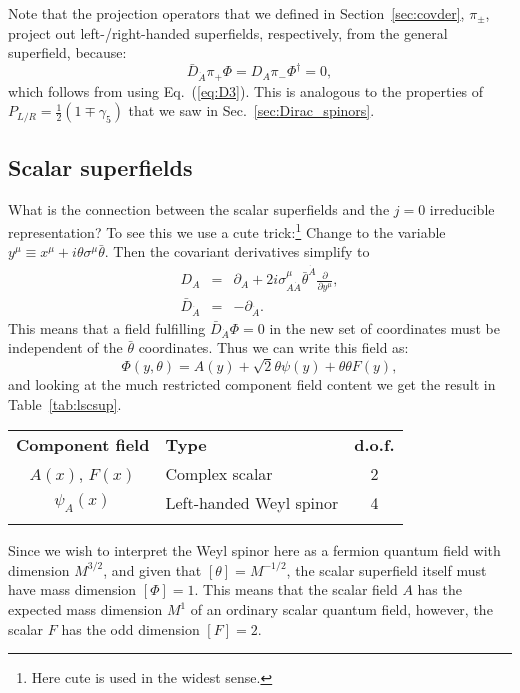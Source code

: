 \documentclass[notes.tex]{subfiles}
\begin{document}
Note that the projection operators that we defined in Section~\ref{sec:covder}, $\pi_\pm$, project out left-/right-handed superfields, respectively,  from the general superfield, because:
\[\bar{D}_{\dot{A}}\pi_+\Phi = D_A \pi_- \Phi^\dagger = 0, \]
which follows from using Eq.~(\ref{eq:D3}). This is analogous to the properties of $P_{L/R} = \frac{1}{2}(1\mp \gamma_5)$ that we saw in Sec.~\ref{sec:Dirac_spinors}.

\subsection{Scalar superfields}
What is the connection between the scalar superfields and the $j=0$ irreducible representation? To see this we use a cute trick:\footnote{Here cute is used in the widest sense.} Change to the variable $y^\mu \equiv x^\mu + i\theta\sigma^\mu \bar{\theta}$. Then the covariant derivatives simplify to
\begin{eqnarray}
D_A &=& \partial_A + 2i\sigma^\mu_{A\dot{A}}\bar{\theta}^{\dot{A}}\frac{\partial}{\partial y^\mu},\\
\bar{D}_{\dot{A}} &=& -\partial_{\dot{A}}.
\end{eqnarray}
This means that a field fulfilling $\bar{D}_{\dot{A}} \Phi = 0$ in the new set of coordinates must be independent of the $\bar{\theta}$ coordinates. Thus we can write this field as:
\begin{equation}
\Phi(y, \theta) = A(y) + \sqrt{2}\theta\psi(y) + \theta\theta F(y),
\label{eq:leftscalarsuperfield_y}
\end{equation}
and looking at the much restricted component field content we get the result in Table~\ref{tab:lscsup}.
\begin{center}
   \begin{tabular}{c |l| c} 
   \noalign{\smallskip}\hline\noalign{\smallskip}
   {\bf Component field} & {\bf Type} & {\bf d.o.f.} \\
   \noalign{\smallskip}\hline\noalign{\smallskip}
   $A(x)$, $F(x)$ & Complex scalar & 2\\
   $\psi_A(x)$ & Left-handed Weyl spinor & 4\\
   \noalign{\smallskip}\hline\noalign{\smallskip}
    \end{tabular}
   \end{center}

Since we wish to interpret the Weyl spinor here as a fermion quantum field with dimension $M^{3/2}$, and given that $[\theta]=M^{-1/2}$, the scalar superfield itself must have mass dimension $[\Phi]=1$. This means that the scalar field $A$ has the expected mass dimension $M^1$ of an ordinary scalar quantum field, however, the scalar $F$ has the odd dimension $[F]=2$.
\end{document}
